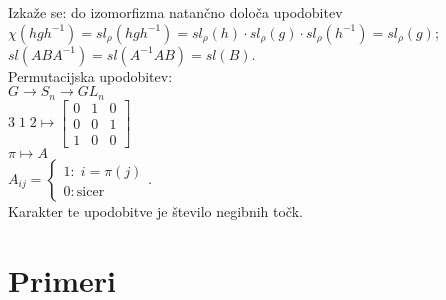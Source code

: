 \documentclass[a4paper, 12pt]{book}
\theoremstyle{definition}
\theoremstyle{remark}
\begin{document}
Izkaže se: do izomorfizma natančno določa upodobitev \\
$\chi \left(h g h^{-1}\right) = sl_{\rho}\left(h g h^{-1}\right) = sl_{\rho}(h) \cdot sl_{\rho}(g) \cdot sl_{\rho}(h^{-1})
= sl_{\rho}(g)$; \\
$sl\left(A B A^{-1}\right) = sl\left(A^{-1} A B\right) = sl(B)$. \\
Permutacijska upodobitev: \\
$G \to S_n \to GL_n$ \\
$3 \; 1 \; 2 \mapsto
\begin{bmatrix}
  0 & 1 & 0 \\
  0 & 0 & 1 \\
  1 & 0 & 0
\end{bmatrix}$ \\
$\pi \mapsto A$ \\
$A_{ij} = \begin{cases}
  1: \; i = \pi(j) \\
  0: \text{sicer}
\end{cases}$. \\
Karakter te upodobitve je število negibnih točk.


\section{Primeri}
\end{document}
